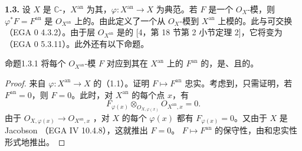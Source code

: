 \textbf{1.3.} 设 $X$ 是 $\mathbb C$-，$X^{\mathrm{an}}$ 为其，$\varphi:X^{\mathrm{an}}\to X$ 为典范。若 $F$ 是一个 $O_X$-模，则 $\varphi^*F=F^{\mathrm{an}}$ 是 $O_{X^{\mathrm{an}}}$ 上的。由此定义了一个从 $O_X$-模到 $X^{\mathrm{an}}$ 上模的。此与可交换（EGA 0 4.3.2）。由于层 $O_{X^{\mathrm{an}}}$ 是的 [4，第 18 节第 2 小节定理 2]，它将变为（EGA 0 5.3.11）。此外还有以下命题。

\begin{SGAresult}{命题}{1.3.1}
将每个 $O_{X^{\mathrm{an}}}$-模 $F$ 对应到其在 $X^{\mathrm{an}}$ 上的 $F^{\mathrm{an}}$ 的，是、且的。
\end{SGAresult}
\begin{proof}
来自 $\varphi:X^{\mathrm{an}}\to X$ 的（1.1）。证明 $F\mapsto F^{\mathrm{an}}$ 忠实。考虑到，只需证明，若 $F^{\mathrm{an}}=0$，则 $F=0$。此时，对 $X^{\mathrm{an}}$ 的每个点 $x$，有
\[
F_{\varphi(x)}\otimes_{O_{X,\varphi(x)}}O_{X^{\mathrm{an}},x}=0.
\]
由于 $O_{X,\varphi(x)}\to O_{X^{\mathrm{an}},x}$ ，对 $X$ 的每个 $\varphi(x)$ 都有 $F_{\varphi(x)}=0$。又由于 $X$ 是 Jacobson （EGA IV 10.4.8），这就推出 $F=0$。
 $F\mapsto F^{\mathrm{an}}$ 的保守性，由和忠实性形式地推出。
\end{proof}

